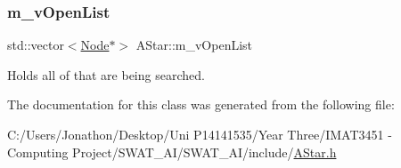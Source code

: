 \mbox{\label{class_a_star_ac8f9eb403a0559882f1e199061d2d6c1}} 
\subsubsection{\texorpdfstring{m\+\_\+v\+Open\+List}{m\_vOpenList}}
{\footnotesize\ttfamily std\+::vector$<$\hyperlink{struct_node}{Node}$\ast$$>$ A\+Star\+::m\+\_\+v\+Open\+List\hspace{0.3cm}{\ttfamily [private]}}



Holds all of that are being searched. 



The documentation for this class was generated from the following file\+:\begin{DoxyCompactItemize}
\item 
C\+:/\+Users/\+Jonathon/\+Desktop/\+Uni P14141535/\+Year Three/\+I\+M\+A\+T3451 -\/ Computing Project/\+S\+W\+A\+T\+\_\+\+A\+I/\+S\+W\+A\+T\+\_\+\+A\+I/include/\hyperlink{_a_star_8h}{A\+Star.\+h}\end{DoxyCompactItemize}
